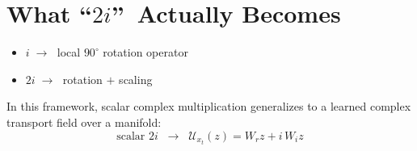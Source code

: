 \documentclass[11pt]{article}
\begin{document}
\section{What \textquotedblleft$2i$\textquotedblright\ Actually Becomes}

\begin{itemize}
    \item $i \;\to\;$ local $90^{\circ}$ rotation operator
    \item $2i \;\to\;$ rotation $+$ scaling
\end{itemize}

In this framework, scalar complex multiplication generalizes to a learned complex transport
field over a manifold:
\[
    \text{scalar } 2i
    \;\;\longrightarrow\;\;
    \mathcal{U}_{x_t}(z) = W_r z + i\,W_i z
\]
\end{document}
